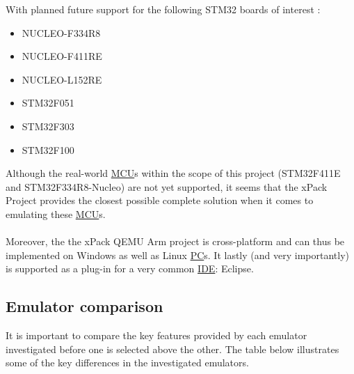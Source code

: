 With planned future support for the following STM32 boards of interest \cite{xPack}:

\begin{itemize}
\item NUCLEO-F334R8
\item NUCLEO-F411RE
\item NUCLEO-L152RE
\item STM32F051
\item STM32F303
\item STM32F100
\end{itemize}

Although the real-world \hyperref[listAbr]{MCU}s within the scope of this project (STM32F411E and STM32F334R8-Nucleo) are not yet supported, it seems that the xPack Project provides the closest possible complete solution when it comes to emulating these \hyperref[listAbr]{MCU}s.
\\\\
Moreover, the the xPack QEMU Arm project is cross-platform and can thus be implemented on Windows as well as Linux \hyperref[listAbr]{PC}s. It lastly (and very importantly) is supported as a plug-in for a very common \hyperref[listAbr]{IDE}: Eclipse.

\newpage\cleardoublepage
\subsection{Emulator comparison}
\label{emulComp}
It is important to compare the key features provided by each emulator investigated before one is selected above the other. The table below illustrates some of the key differences in the investigated emulators.

